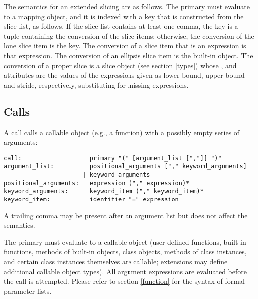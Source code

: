 The semantics for an extended slicing are as follows.  The primary
must evaluate to a mapping object, and it is indexed with a key that
is constructed from the slice list, as follows.  If the slice list
contains at least one comma, the key is a tuple containing the
conversion of the slice items; otherwise, the conversion of the lone
slice item is the key.  The conversion of a slice item that is an
expression is that expression.  The conversion of an ellipsis slice
item is the built-in  object.  The conversion of a
proper slice is a slice object (see section \ref{types}) whose
,  and  attributes are the
values of the expressions given as lower bound, upper bound and
stride, respectively, substituting  for missing
expressions.

\subsection{Calls\label{calls}}

A call calls a callable object (e.g., a function) with a possibly empty
series of arguments:

\begin{verbatim}
call:                   primary "(" [argument_list [","]] ")"
argument_list:          positional_arguments ["," keyword_arguments]
                      | keyword_arguments
positional_arguments:   expression ("," expression)*
keyword_arguments:      keyword_item ("," keyword_item)*
keyword_item:           identifier "=" expression
\end{verbatim}

A trailing comma may be present after an argument list but does not
affect the semantics.

The primary must evaluate to a callable object (user-defined
functions, built-in functions, methods of built-in objects, class
objects, methods of class instances, and certain class instances
themselves are callable; extensions may define additional callable
object types).  All argument expressions are evaluated before the call
is attempted.  Please refer to section \ref{function} for the syntax
of formal parameter lists.

